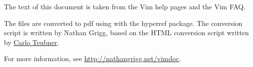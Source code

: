 \begin{minipage}{5in}
The text of this document is taken from the Vim
help pages and the Vim FAQ.

\bigskip

The files are converted to pdf using \engine with the hyperref package.
The conversion script
is written by Nathan Grigg, based on the HTML conversion script written
by \href{http://github.com/c4rlo/vimhelp/}{Carlo Teubner}.

\bigskip

For more information, see \url{http://nathangrigg.net/vimdoc}.
\end{minipage}
